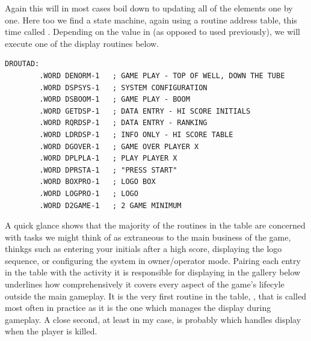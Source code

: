 Again this will in most cases boil down to updating all of the elements one by one. Here too we find a state machine, again using
a routine address table, this time called . Depending on the value in  (as opposed to  used
previously), we will execute one of the display routines below. 
\clearpage
\begin{lstlisting}
DROUTAD:
        .WORD DENORM-1   ; GAME PLAY - TOP OF WELL, DOWN THE TUBE
        .WORD DSPSYS-1   ; SYSTEM CONFIGURATION
        .WORD DSBOOM-1   ; GAME PLAY - BOOM
        .WORD GETDSP-1   ; DATA ENTRY - HI SCORE INITIALS
        .WORD RQRDSP-1   ; DATA ENTRY - RANKING
        .WORD LDRDSP-1   ; INFO ONLY - HI SCORE TABLE
        .WORD DGOVER-1   ; GAME OVER PLAYER X
        .WORD DPLPLA-1   ; PLAY PLAYER X
        .WORD DPRSTA-1   ; "PRESS START"
        .WORD BOXPRO-1   ; LOGO BOX
        .WORD LOGPRO-1   ; LOGO
        .WORD D2GAME-1   ; 2 GAME MINIMUM
\end{lstlisting}

A quick glance shows that the majority of the routines in the table are concerned with  tasks we might think of as extraneous
to the main business of the game,  thinkgs such as entering your initials
after a high score, displaying the logo sequence, or configuring the system in owner/operator mode. 
Pairing each entry in the table with the activity it is responsible for displaying in the gallery below underlines how comprehensively
it covers every aspect of the game's lifecyle outside the main gameplay.
It is the very first routine in the table, ,
that is called most often in practice as it is the one which manages the display during gameplay. A close second, at least in my case,
is probably  which handles display when the player is killed.

